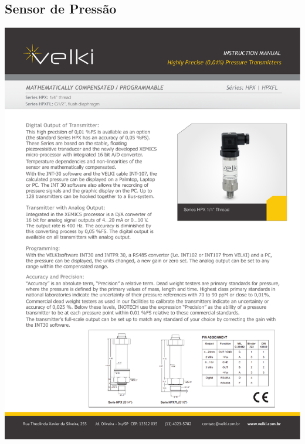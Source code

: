 \subsection{Sensor de Pressão}
\includegraphics[width=1\columnwidth]{figs/datasheets/profundimetro.pdf}

